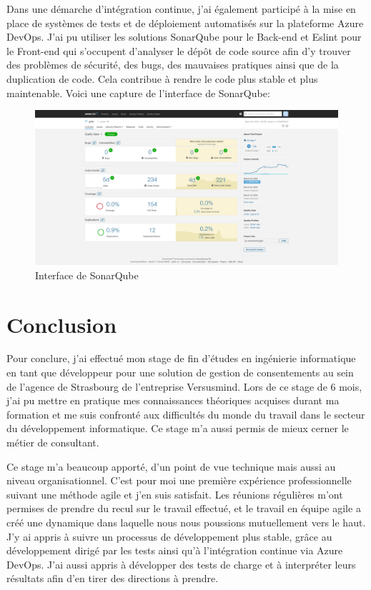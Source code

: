 \documentclass[12pt, a4paper]{report}
\begin{document}
Dans une démarche d'intégration continue, j'ai également participé à la mise en place de systèmes de tests et de déploiement automatisés sur la plateforme Azure DevOps.\newline
J'ai pu utiliser les solutions SonarQube pour le Back-end et Eslint pour le Front-end qui s'occupent d'analyser le dépôt de code source afin d'y trouver des problèmes de sécurité, des bugs, des mauvaises pratiques ainsi que de la duplication de code.\newline
Cela contribue à rendre le code plus stable et plus maintenable.\newline
Voici une capture de l'interface de SonarQube:
\begin{figure}[H]
    \begin{center}
        \includegraphics[width=\linewidth]{sonarqube.png}
    \end{center}
    \caption{Interface de SonarQube}
\end{figure}
\chapter{Conclusion}
Pour conclure, j'ai effectué mon stage de fin d'études en ingénierie informatique en tant que développeur pour une solution de gestion de consentements au sein de l'agence de Strasbourg de l'entreprise Versusmind.\newline
Lors de ce stage de 6 mois, j'ai pu mettre en pratique mes connaissances théoriques acquises durant ma formation et me suis confronté aux difficultés du monde du travail dans le secteur du développement informatique.
Ce stage m'a aussi permis de mieux cerner le métier de consultant.\newline

Ce stage m'a beaucoup apporté, d'un point de vue technique mais aussi au niveau organisationnel.\newline
C'est pour moi une première expérience professionnelle suivant une méthode agile et j'en suis satisfait.
Les réunions régulières m'ont permises de prendre du recul sur le travail effectué, et le travail en équipe agile a créé une dynamique dans laquelle nous nous poussions mutuellement vers le haut.\newline
J'y ai appris à suivre un processus de développement plus stable, grâce au développement dirigé par les tests ainsi qu'à l'intégration continue via Azure DevOps.\newline
J'ai aussi appris à développer des tests de charge et à interpréter leurs résultats afin d'en tirer des directions à prendre.\newline
\end{document}
